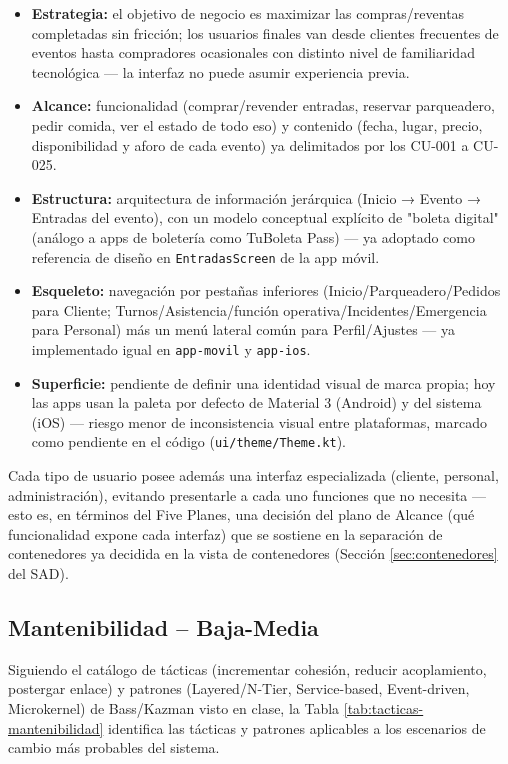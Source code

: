 \documentclass[12pt,a4paper]{article}
\begin{document}
\begin{itemize}
\item \textbf{Estrategia:} el objetivo de negocio es maximizar las compras/reventas completadas
sin fricción; los usuarios finales van desde clientes frecuentes de eventos hasta compradores
ocasionales con distinto nivel de familiaridad tecnológica — la interfaz no puede asumir
experiencia previa.
\item \textbf{Alcance:} funcionalidad (comprar/revender entradas, reservar parqueadero, pedir
comida, ver el estado de todo eso) y contenido (fecha, lugar, precio, disponibilidad y aforo de
cada evento) ya delimitados por los CU-001 a CU-025.
\item \textbf{Estructura:} arquitectura de información jerárquica (Inicio → Evento → Entradas del
evento), con un modelo conceptual explícito de "boleta digital" (análogo a apps de boletería como
TuBoleta Pass) — ya adoptado como referencia de diseño en \texttt{EntradasScreen} de la app móvil.
\item \textbf{Esqueleto:} navegación por pestañas inferiores (Inicio/Parqueadero/Pedidos para
Cliente; Turnos/Asistencia/función operativa/Incidentes/Emergencia para Personal) más un menú
lateral común para Perfil/Ajustes — ya implementado igual en \texttt{app-movil} y \texttt{app-ios}.
\item \textbf{Superficie:} pendiente de definir una identidad visual de marca propia; hoy las
apps usan la paleta por defecto de Material 3 (Android) y del sistema (iOS) — riesgo menor de
inconsistencia visual entre plataformas, marcado como pendiente en el código
(\texttt{ui/theme/Theme.kt}).
\end{itemize}

Cada tipo de usuario posee además una interfaz especializada (cliente, personal, administración),
evitando presentarle a cada uno funciones que no necesita — esto es, en términos del Five Planes,
una decisión del plano de Alcance (qué funcionalidad expone cada interfaz) que se sostiene en la
separación de contenedores ya decidida en la vista de contenedores (Sección \ref{sec:contenedores}
del SAD).

\subsection{Mantenibilidad -- Baja-Media}

Siguiendo el catálogo de tácticas (incrementar cohesión, reducir acoplamiento, postergar enlace) y
patrones (Layered/N-Tier, Service-based, Event-driven, Microkernel) de Bass/Kazman visto en clase,
la Tabla \ref{tab:tacticas-mantenibilidad} identifica las tácticas y patrones aplicables a los
escenarios de cambio más probables del sistema.
\end{document}

